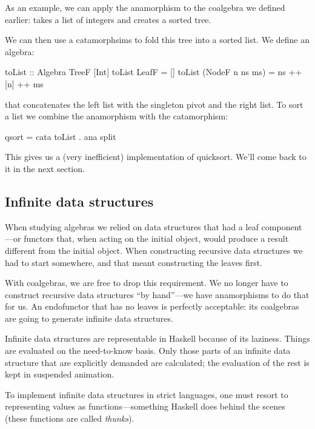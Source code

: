 \documentclass[DaoFP]{subfiles}
\begin{document}
As an example, we can apply the anamorphism to the  coalgebra we defined earlier:  takes a list of integers and creates a sorted tree. 

We can then use a catamorphsims to fold this tree into a sorted list. We define an algebra:
\begin{haskell}
toList :: Algebra TreeF [Int]
toList LeafF = []
toList (NodeF n ns ms) = ns ++ [n] ++ ms
\end{haskell}
that concatenates the left list with the singleton pivot and the right list. To sort a list we combine the anamorphism with the catamorphism:
\begin{haskell}
qsort = cata toList . ana split
\end{haskell}
This gives us a (very inefficient) implementation of quicksort. We'll come back to it in the next section.

\subsection{Infinite data structures}

When studying algebras we relied on data structures that had a leaf component---or functors that, when acting on the initial object, would produce a result different from the initial object. When constructing recursive data structures we had to start somewhere, and that meant constructing the leaves first. 

With coalgebras, we are free to drop this requirement. We no longer have to construct recursive data structures ``by hand''---we have anamorphisms to do that for us. An endofunctor that has no leaves is perfectly acceptable: its coalgebras are going to generate infinite data structures. 

Infinite data structures are representable in Haskell because of its laziness. Things are evaluated on the need-to-know basis. Only those parts of an infinite data structure that are explicitly demanded are calculated; the evaluation of the rest is kept in suspended animation. 

To implement infinite data structures in strict languages, one must resort to representing values as functions---something Haskell does behind the scenes (these functions are called \emph{thunks}).
\end{document}
